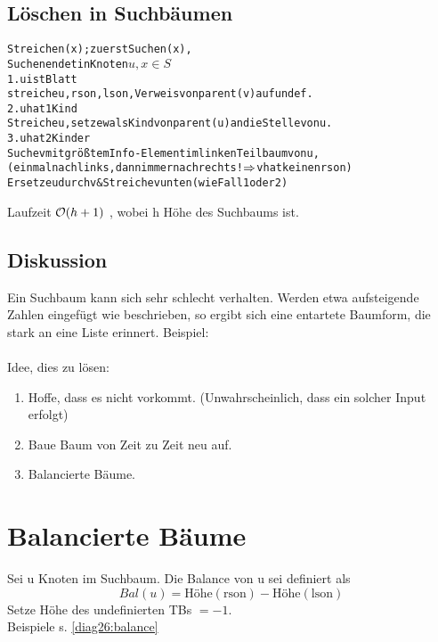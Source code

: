         \subsection{Löschen in Suchbäumen}
            \begin{alltt}
			Streichen (x); zuerst Suchen(x), 
			Suchen endet in Knoten \( u, x \in S \)
			1. u ist Blatt
			streiche u, rson, lson, Verweis von parent(v) auf undef.
			2. u hat 1 Kind
			Streiche u, setze w als Kind von parent(u) an die Stelle von u.
			3. u hat 2 Kinder
			Suche v mit größtem Info-Element im linken Teilbaum von u, 
			(einmal nach links, dann immer nach rechts! \( \Ra \) v hat keinen rson)
			Ersetze u durch v & Streiche v unten (wie Fall 1 oder 2)
            \end{alltt}
            
            Laufzeit $\mathcal{O}(h+1)$ , wobei h Höhe des Suchbaums ist.\\

        \subsection{Diskussion}
            Ein Suchbaum kann sich sehr schlecht verhalten. Werden etwa aufsteigende Zahlen eingefügt wie beschrieben,
            so ergibt sich eine entartete Baumform, die stark an eine Liste erinnert. Beispiel: \\
             \\
            Idee, dies zu lösen: \\
            \begin{enumerate}[1]
                \item Hoffe, dass es nicht vorkommt. (Unwahrscheinlich, dass ein solcher Input erfolgt)
                \item Baue Baum von Zeit zu Zeit neu auf.
                \item Balancierte Bäume.
            \end{enumerate}

    \section{Balancierte Bäume}
        Sei u Knoten im Suchbaum. Die Balance von u sei definiert als 
        $$
            Bal(u) = \text{Höhe}(\text{rson}) - \text{Höhe}(\text{lson})
        $$
        Setze Höhe des undefinierten TBs $= -1$.\\
        Beispiele s. \autoref{diag26:balance}

